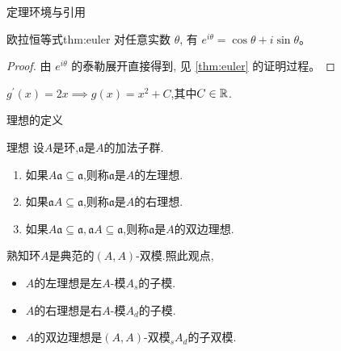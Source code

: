
\begin{frame}{定理环境与引用}
  \begin{theorem}{欧拉恒等式}{thm:euler}
    对任意实数 $\theta$, 有 $e^{i\theta} = \cos\theta + i\sin\theta$。
  \end{theorem}

  \pause

  \begin{proof}
    由 $e^{i\theta}$ 的泰勒展开直接得到, 见 \ref{thm:euler} 的证明过程。
  \end{proof}
	$g^{\prime}\left(x\right)=2x\implies g\left(x\right)=x^{2}+C$,其中$C\in\mathbb{R}$.
\end{frame}

\begin{frame}{理想的定义}
	\begin{definition}{理想}{}
		设$A$是环,$\mathfrak{a}$是$A$的加法子群.
		\begin{enumerate}
			\item 如果$A\mathfrak{a}\subseteq\mathfrak{a}$,则称$\mathfrak{a}$是$A$的左理想.
			\item 如果$\mathfrak{a}A\subseteq\mathfrak{a}$,则称$\mathfrak{a}$是$A$的右理想.
			\item 如果$A\mathfrak{a}\subseteq\mathfrak{a},\mathfrak{a}A\subseteq\mathfrak{a}$,则称$\mathfrak{a}$是$A$的双边理想.
		\end{enumerate}
	\end{definition}
	熟知环$A$是典范的$\left(A,A\right)$-双模.照此观点,
	\begin{itemize}
		\item $A$的左理想是左$A$-模$A_{s}$的子模.
		\item $A$的右理想是右$A$-模$A_{d}$的子模.
		\item $A$的双边理想是$\left(A,A\right)$-双模$_{s}A_{d}$的子双模.
	\end{itemize}
\end{frame}
